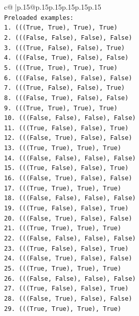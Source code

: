 \documentclass{article}
\begin{document}
{\begin{supertabular}{c@{$\;$}|p{.15\linewidth}@{}p{.15\linewidth}p{.15\linewidth}p{.15\linewidth}p{.15\linewidth}p{.15\linewidth}}
{{{\\ 
\texttt{Preloaded examples:} \\
\texttt{1. (((True, True), True), True)} \\
\texttt{2. (((False, False), False), False)} \\
\texttt{3. (((True, False), False), True)} \\
\texttt{4. (((False, True), False), False)} \\
\texttt{5. (((True, True), True), True)} \\
\texttt{6. (((False, False), False), False)} \\
\texttt{7. (((True, False), False), True)} \\
\texttt{8. (((False, True), False), False)} \\
\texttt{9. (((True, True), True), True)} \\
\texttt{10. (((False, False), False), False)} \\
\texttt{11. (((True, False), False), True)} \\
\texttt{12. (((False, True), False), False)} \\
\texttt{13. (((True, True), True), True)} \\
\texttt{14. (((False, False), False), False)} \\
\texttt{15. (((True, False), False), True)} \\
\texttt{16. (((False, True), False), False)} \\
\texttt{17. (((True, True), True), True)} \\
\texttt{18. (((False, False), False), False)} \\
\texttt{19. (((True, False), False), True)} \\
\texttt{20. (((False, True), False), False)} \\
\texttt{21. (((True, True), True), True)} \\
\texttt{22. (((False, False), False), False)} \\
\texttt{23. (((True, False), False), True)} \\
\texttt{24. (((False, True), False), False)} \\
\texttt{25. (((True, True), True), True)} \\
\texttt{26. (((False, False), False), False)} \\
\texttt{27. (((True, False), False), True)} \\
\texttt{28. (((False, True), False), False)} \\
\texttt{29. (((True, True), True), True)} \\
}}}
\end{supertabular}}
\end{document}

